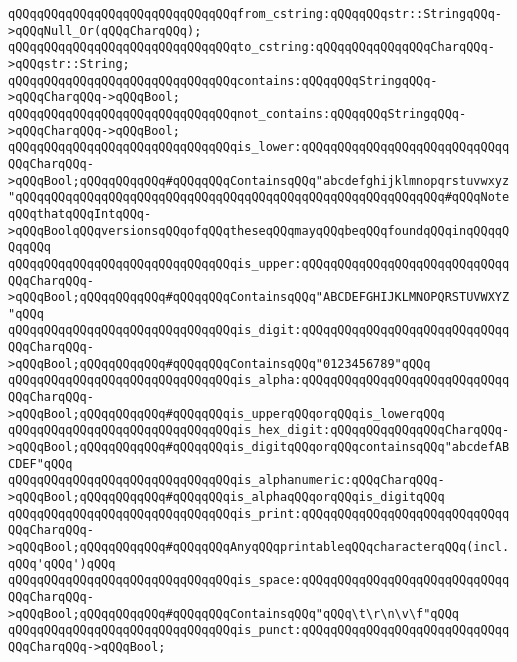 \newline
\verb|qQQqqQQqqQQqqQQqqQQqqQQqqQQqqQQqfrom_cstring:qQQqqQQqstr::StringqQQq->qQQqNull_Or(qQQqCharqQQq);|\newline
\verb|qQQqqQQqqQQqqQQqqQQqqQQqqQQqqQQqto_cstring:qQQqqQQqqQQqqQQqCharqQQq->qQQqstr::String;|\newline
\newline
\verb|qQQqqQQqqQQqqQQqqQQqqQQqqQQqqQQqcontains:qQQqqQQqStringqQQq->qQQqCharqQQq->qQQqBool;|\newline
\verb|qQQqqQQqqQQqqQQqqQQqqQQqqQQqqQQqnot_contains:qQQqqQQqStringqQQq->qQQqCharqQQq->qQQqBool;|\newline
\newline
\verb|qQQqqQQqqQQqqQQqqQQqqQQqqQQqqQQqis_lower:qQQqqQQqqQQqqQQqqQQqqQQqqQQqqQQqCharqQQq->qQQqBool;qQQqqQQqqQQq#qQQqqQQqContainsqQQq"abcdefghijklmnopqrstuvwxyz"qQQqqQQqqQQqqQQqqQQqqQQqqQQqqQQqqQQqqQQqqQQqqQQqqQQqqQQqqQQq#qQQqNoteqQQqthatqQQqIntqQQq->qQQqBoolqQQqversionsqQQqofqQQqtheseqQQqmayqQQqbeqQQqfoundqQQqinqQQqqQQqqQQq|\newline
\verb|qQQqqQQqqQQqqQQqqQQqqQQqqQQqqQQqis_upper:qQQqqQQqqQQqqQQqqQQqqQQqqQQqqQQqCharqQQq->qQQqBool;qQQqqQQqqQQq#qQQqqQQqContainsqQQq"ABCDEFGHIJKLMNOPQRSTUVWXYZ"qQQq|\newline
\verb|qQQqqQQqqQQqqQQqqQQqqQQqqQQqqQQqis_digit:qQQqqQQqqQQqqQQqqQQqqQQqqQQqqQQqCharqQQq->qQQqBool;qQQqqQQqqQQq#qQQqqQQqContainsqQQq"0123456789"qQQq|\newline
\verb|qQQqqQQqqQQqqQQqqQQqqQQqqQQqqQQqis_alpha:qQQqqQQqqQQqqQQqqQQqqQQqqQQqqQQqCharqQQq->qQQqBool;qQQqqQQqqQQq#qQQqqQQqis_upperqQQqorqQQqis_lowerqQQq|\newline
\verb|qQQqqQQqqQQqqQQqqQQqqQQqqQQqqQQqis_hex_digit:qQQqqQQqqQQqqQQqCharqQQq->qQQqBool;qQQqqQQqqQQq#qQQqqQQqis_digitqQQqorqQQqcontainsqQQq"abcdefABCDEF"qQQq|\newline
\verb|qQQqqQQqqQQqqQQqqQQqqQQqqQQqqQQqis_alphanumeric:qQQqCharqQQq->qQQqBool;qQQqqQQqqQQq#qQQqqQQqis_alphaqQQqorqQQqis_digitqQQq|\newline
\verb|qQQqqQQqqQQqqQQqqQQqqQQqqQQqqQQqis_print:qQQqqQQqqQQqqQQqqQQqqQQqqQQqqQQqCharqQQq->qQQqBool;qQQqqQQqqQQq#qQQqqQQqAnyqQQqprintableqQQqcharacterqQQq(incl.qQQq'qQQq')qQQq|\newline
\verb|qQQqqQQqqQQqqQQqqQQqqQQqqQQqqQQqis_space:qQQqqQQqqQQqqQQqqQQqqQQqqQQqqQQqCharqQQq->qQQqBool;qQQqqQQqqQQq#qQQqqQQqContainsqQQq"qQQq\t\r\n\v\f"qQQq|\newline
\verb|qQQqqQQqqQQqqQQqqQQqqQQqqQQqqQQqis_punct:qQQqqQQqqQQqqQQqqQQqqQQqqQQqqQQqCharqQQq->qQQqBool;|\newline
